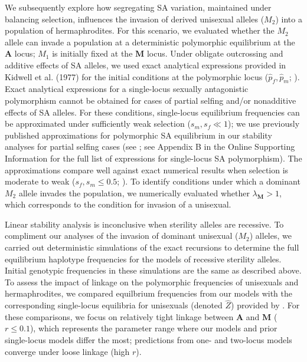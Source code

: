 \documentclass{article}
\begin{document}
We subsequently explore how segregating SA variation, maintained under balancing selection, influences the invasion of derived unisexual alleles ($M_2$) into a population of hermaphrodites. For this scenario, we evaluated whether the $M_2$ allele can invade a population at a deterministic polymorphic equilibrium at the $\mathbf{A}$ locus; $M_1$ is initially fixed at the $\mathbf{M}$ locus. Under obligate outcrossing and additive effects of SA alleles, we used exact analytical expressions provided in Kidwell et al. (1977) for the initial conditions at the polymorphic locus ($\hat{p}_f,\hat{p}_m$; \citealt{Kidwell1977}). Exact analytical expressions for a single-locus sexually antagonistic polymorphism cannot be obtained for cases of partial selfing and/or nonadditive effects of SA alleles. For these conditions, single-locus equilibrium frequencies can be approximated under sufficiently weak selection ($s_m,s_f \ll 1$); we use previously published approximations for polymorphic SA equilibrium in our stability analyses for partial selfing cases (see \citealt{JordanConnallon2014,ConnallonJordan2016}; see Appendix B in the Online Supporting Information  for the full list of expressions for single-locus SA polymorphism). The approximations compare well against exact numerical results when selection is moderate to weak ($s_f,s_m \leq 0.5$; \citealt{JordanConnallon2014, ConnallonJordan2016, Olito2016}). To identify conditions under which a dominant $M_2$ allele invades the population, we numerically evaluated whether $\lambda_{\mathbf{M}} > 1$, which corresponds to the condition for invasion of a unisexual.

Linear stability analysis is inconclusive when sterility alleles are recessive. To compliment our analyses of the invasion of dominant unisexual ($M_2$) alleles, we carried out deterministic simulations of the exact recursions to determine the full equilibrium haplotype frequencies for the models of recessive sterility alleles. Initial genotypic frequencies in these simulations are the same as described above. To assess the impact of linkage on the polymorphic frequencies of unisexuals and hermaphrodites, we compared equilbrium frequencies from our models with the corresponding single-locus equilibria for unisexuals (denoted $\hat{Z}$) provided by \citet{Charlesworth1978a}. For these comparisons, we focus on relatively tight linkage between $\mathbf{A}$ and $\mathbf{M}$ ($r\leq 0.1$), which represents the parameter range where our models and prior single-locus models differ the most; predictions from one- and two-locus models converge under loose linkage (high $r$). 
\end{document}
